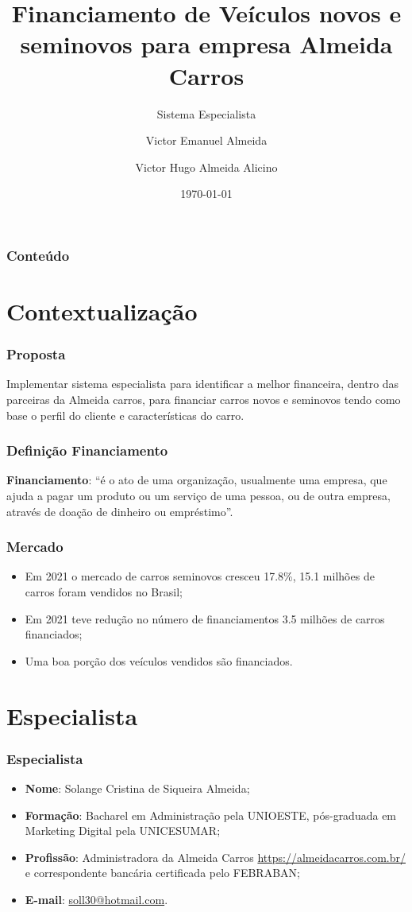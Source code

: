 \documentclass[12pt]{beamer}
\author[Victor * Almeida *]{Victor Emanuel Almeida \and Victor Hugo Almeida Alicino}
\title[Financiamento de veículos]{Financiamento de Veículos novos e seminovos para empresa Almeida Carros}
\subtitle{Sistema Especialista}
\date{\today}
\institute{UNIOESTE}
\begin{document}
\frame{\titlepage}

\begin{frame}
    \frametitle{Conteúdo}
    \tableofcontents
\end{frame}

\section{Contextualização}
\begin{frame}
    \frametitle{Proposta}

    \large Implementar sistema especialista para identificar a melhor financeira, dentro das parceiras da Almeida carros, para financiar carros novos e seminovos tendo como base o perfil do cliente e características do carro.

\end{frame}

\begin{frame}
    \frametitle{Definição Financiamento}
    \textbf{Financiamento}: ``é o ato de uma organização, usualmente uma empresa, que ajuda a pagar um produto ou um serviço de uma pessoa, ou de outra empresa, através de doação de dinheiro ou empréstimo''\cite{financiamento}.
\end{frame}

\begin{frame}
    \frametitle{Mercado}
    \begin{itemize}
        \item Em 2021 o mercado de carros seminovos cresceu 17.8\%, 15.1 milhões de carros foram vendidos no Brasil\cite{mercado_seminovos};
        \item Em 2021 teve redução no número de financiamentos 3.5 milhões de carros financiados\cite{financiamento_2022};
        \item Uma boa porção dos veículos vendidos são financiados.
    \end{itemize}
\end{frame}

\section{Especialista}
\begin{frame}
    \frametitle{Especialista}
    \begin{itemize}
        \item\textbf{Nome}: Solange Cristina de Siqueira Almeida;
        \item\textbf{Formação}: Bacharel em Administração pela UNIOESTE, pós-graduada em Marketing Digital pela UNICESUMAR\@;
        \item\textbf{Profissão}: Administradora da Almeida Carros \url{https://almeidacarros.com.br/} e correspondente bancária certificada pelo FEBRABAN\@;
        \item\textbf{E-mail}: \url{soll30@hotmail.com}.
    \end{itemize}
\end{frame}
\end{document}
